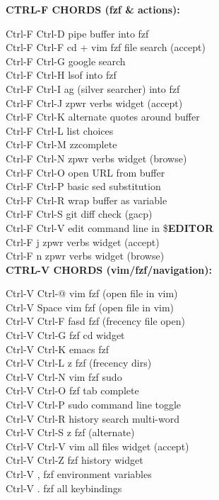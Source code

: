 \documentclass[11pt,a4paper,twoside]{book}
\begin{document}
\vspace{12pt}
{\bfseries\color{neonyellow} CTRL-F CHORDS (fzf \& actions):}\vspace{4pt}

Ctrl-F Ctrl-D         pipe buffer into fzf\\
Ctrl-F Ctrl-F         cd + vim fzf file search (accept)\\
Ctrl-F Ctrl-G         google search\\
Ctrl-F Ctrl-H         lsof into fzf\\
Ctrl-F Ctrl-I         ag (silver searcher) into fzf\\
Ctrl-F Ctrl-J         zpwr verbs widget (accept)\\
Ctrl-F Ctrl-K         alternate quotes around buffer\\
Ctrl-F Ctrl-L         list choices\\
Ctrl-F Ctrl-M         zzcomplete\\
Ctrl-F Ctrl-N         zpwr verbs widget (browse)\\
Ctrl-F Ctrl-O         open URL from buffer\\
Ctrl-F Ctrl-P         basic sed substitution\\
Ctrl-F Ctrl-R         wrap buffer as variable\\
Ctrl-F Ctrl-S         git diff check (gacp)\\
Ctrl-F Ctrl-V         edit command line in \$\textbf{EDITOR}\\
Ctrl-F j              zpwr verbs widget (accept)\\
Ctrl-F n              zpwr verbs widget (browse)\\


\vspace{12pt}
{\bfseries\color{neonyellow} CTRL-V CHORDS (vim/fzf/navigation):}\vspace{4pt}

Ctrl-V Ctrl-@         vim fzf (open file in vim)\\
Ctrl-V Space          vim fzf (open file in vim)\\
Ctrl-V Ctrl-F         fasd fzf (frecency file open)\\
Ctrl-V Ctrl-G         fzf cd widget\\
Ctrl-V Ctrl-K         emacs fzf\\
Ctrl-V Ctrl-L         z fzf (frecency dirs)\\
Ctrl-V Ctrl-N         vim fzf sudo\\
Ctrl-V Ctrl-O         fzf tab complete\\
Ctrl-V Ctrl-P         sudo command line toggle\\
Ctrl-V Ctrl-R         history search multi-word\\
Ctrl-V Ctrl-S         z fzf (alternate)\\
Ctrl-V Ctrl-V         vim all files widget (accept)\\
Ctrl-V Ctrl-Z         fzf history widget\\
Ctrl-V ,              fzf environment variables\\
Ctrl-V .              fzf all keybindings\\
\end{document}
